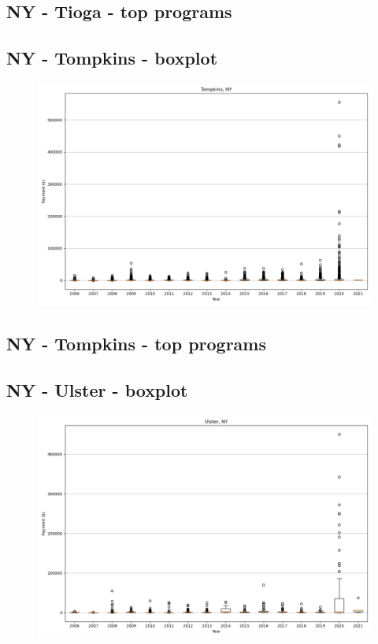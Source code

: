 \subsection*{NY - Tioga - top programs}

\newpage
\subsection*{NY - Tompkins - boxplot}
\begin{figure}[h]
\centering
\includegraphics[width=7in]{../output/boxplots/counties/Tompkins-NY_boxplot.png}
\end{figure}


\subsection*{NY - Tompkins - top programs}

\newpage
\subsection*{NY - Ulster - boxplot}
\begin{figure}[h]
\centering
\includegraphics[width=7in]{../output/boxplots/counties/Ulster-NY_boxplot.png}
\end{figure}


